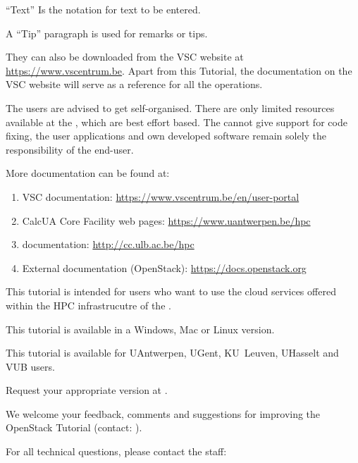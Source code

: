 


``Text'' Is the notation for text to be entered.

\begin{tip}
A ``Tip'' paragraph is used for remarks or tips.
\end{tip}

They can also be downloaded from the VSC website at
\url{https://www.vscentrum.be}.
Apart from this \hpc Tutorial, the documentation on the VSC website
will serve as a reference for all the
operations.


\begin{tip}
The users are advised to get self-organised. There are
only limited resources available at the \hpc, which are best effort based.
The \hpc cannot give support for code fixing, the user applications and own
developed software remain solely the responsibility of the end-user.
\end{tip}

More documentation can be found at:

\begin{enumerate}
  \item  VSC documentation: \url{https://www.vscentrum.be/en/user-portal}
  \ifantwerpen
    \item CalcUA Core Facility web pages: \url{https://www.uantwerpen.be/hpc}
  \fi
  \ifbrussel
    \item \hpcname documentation: \url{http://cc.ulb.ac.be/hpc}
  \fi
  \item  External documentation (OpenStack): \url{https://docs.openstack.org}
\end{enumerate}

This tutorial is intended for users who want to use the cloud services offered within the HPC infrastrucutre of the \strong{\university}.

This tutorial is available in a Windows, Mac or Linux version.

This tutorial is available for UAntwerpen, UGent, KU~Leuven, UHasselt and VUB users.

Request your appropriate version at \hpcinfo.


We welcome your feedback, comments and suggestions for improving the OpenStack
Tutorial (contact: \cloudinfo).

For all technical questions, please contact the \hpc staff:

